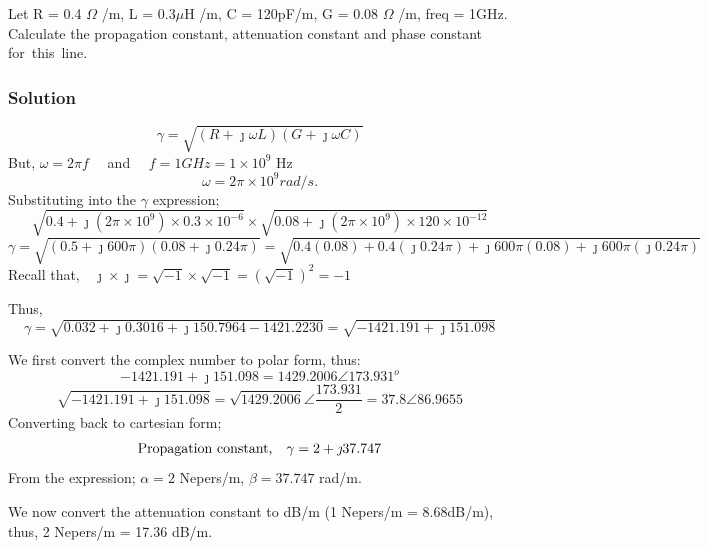 \begin{exmp}
Let R = 0.4 $\Omega$ /m, L = 0.3$\mu$H /m, C = 120pF/m, G = 0.08 $\Omega$ /m, freq = 1GHz. Calculate the propagation constant, attenuation constant and phase constant for\ this\ line.

\subsubsection*{Solution}
\[\gamma = \sqrt{(R+\jmath\omega L)(G + \jmath\omega C)}\]
But, $\omega = 2\pi f\quad$ and $\quad f = 1GHz = 1 \times 10^9 $ Hz
\[\omega = 2\pi \times 10^9rad/s.\]
Substituting into the $\gamma$ expression; 
\begin{dmath*}
\sqrt{0.4+\jmath(2\pi\times10^9)\times0.3\times10^{-6}}\times\sqrt{0.08+\jmath(2\pi\times10^9) \times120 \times10^{-12}} 
\end{dmath*}
\begin{dmath*}
\gamma=\sqrt{(0.5+\jmath600\pi) (0.08+\jmath0.24\pi)}
= \sqrt{0.4(0.08) + 0.4(\jmath0.24\pi) + \jmath600\pi(0.08) + \jmath600\pi(\jmath0.24\pi)}
\end{dmath*} 
Recall  that,$ \quad \jmath \times \jmath = \sqrt{-1} \times \sqrt{-1} = (\sqrt{-1})^2 = -1$

Thus,
\begin{dmath*}
\gamma =\sqrt{0.032 + \jmath 0.3016 +\jmath 150.7964 - 1421.2230} = \sqrt{-1421.191 + \jmath 151.098} 
\end{dmath*}

We first convert the complex number to polar form, thus:
\[-1421.191 + \jmath 151.098 = 1429.2006\angle 173.931^o\]
\begin{dmath*} 
\sqrt{-1421.191 + \jmath 151.098} = \sqrt{1429.2006}\angle \frac{173.931}{2}
=37.8\angle 86.9655 
\end{dmath*}
Converting back to cartesian form;
\[\textnormal{Propagation constant,}\quad\gamma=2 +\jmath 37.747\]
From the expression; $ \alpha = 2 $ Nepers/m, $ \beta = 37.747 $ rad/m.

We now convert the attenuation constant to dB/m (1 Nepers/m = 8.68dB/m), thus, 2 Nepers/m = 17.36 dB/m.
\end{exmp} 

